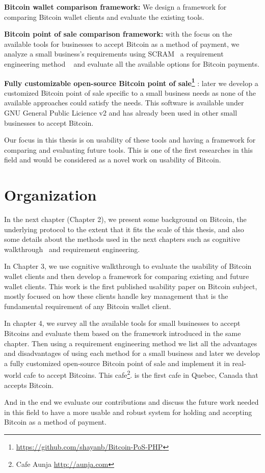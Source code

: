 \textbf{Bitcoin wallet comparison framework:} We design a framework for comparing Bitcoin wallet clients and evaluate the existing tools.

\textbf{Bitcoin point of sale comparison framework: } with the focus on the available tools for businesses to accept Bitcoin as a method of payment, we analyze a small business's requirements using SCRAM~\cite{REScenario} a requirement engineering method ~\cite{dorfman1990system} and evaluate all the available options for Bitcoin payments.

\textbf{Fully customizable open-source Bitcoin point of sale\footnote{\url{https://github.com/shayanb/Bitcoin-PoS-PHP}} }: later we develop a customized Bitcoin point of sale specific to a small business needs as none of the available approaches could satisfy the needs. This software is available under GNU General Public Licience v2 and has already been used in other small businesses to accept Bitcoin.

Our focus in this thesis is on usability of these tools and having a framework for comparing and evaluating future tools. This is one of the first researches in this field and would be considered as a novel work on usability of Bitcoin.

\section{Organization}
In the next chapter (Chapter 2), we present some background on Bitcoin, the underlying protocol to the extent that it fits the scale of this thesis, and also some details about the methods used in the next chapters such as cognitive walkthrough~\cite{WRLP94}  and requirement engineering.

In Chapter 3, we use cognitive walkthrough to evaluate the usability of Bitcoin wallet clients and then develop a framework for comparing existing and future wallet clients. This work is the first published usability paper on Bitcoin subject, mostly focused on how these clients handle key management that is the fundamental requirement of any Bitcoin wallet client.

In chapter 4, we survey all the available tools for small businesses to accept Bitcoins and evaluate them based on the framework introduced in the same chapter. Then using a requirement engineering method we list all the advantages and disadvantages of using each method for a small business and later we develop a fully customized open-source Bitcoin point of sale and implement it in real-world cafe to accept Bitcoins. This cafe\footnote{ Cafe Aunja \url{http://aunja.com}}. is the first cafe in Quebec, Canada that accepts Bitcoin.

And in the end we evaluate our contributions and discuss the future work needed in this field to have a more usable and robust system for holding and accepting Bitcoin as a method of payment.